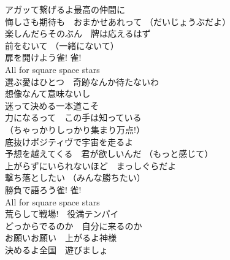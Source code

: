 {アガッて繋げるよ最高の仲間に\\
悔しさも期待も　おまかせあれって （だいじょうぶだよ）\\
楽しんだらそのぶん　牌は応えるはず\\
前をむいて （一緒にないて）\\
扉を開けよう雀! 雀!\\
All for square space stars\\

選ぶ愛はひとつ　奇跡なんか待たないわ\\
想像なんて意味ないし\\
迷って決める一本道こそ\\
力になるって　この手は知っている\\
（ちゃっかりしっかり集まり万点!）\\

底抜けポジティヴで宇宙を走るよ\\
予想を越えてくる　君が欲しいんだ （もっと感じて）\\
上がらずにいられないほど　まっしぐらだよ\\
撃ち落としたい （みんな勝ちたい）\\
勝負で語ろう雀! 雀!\\
All for square space stars\\

荒らして戦場!　役満テンパイ\\
どっからでるのか　自分に来るのか\\
お願いお願い　上がるよ神様\\
決めるよ全国　遊びましょ
}
